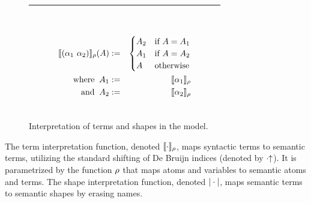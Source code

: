 \documentclass[english, mgr]{iithesis}
\begin{document}
\begin{figure}[htbp]
\begin{tabularx}{\textwidth}{|C|}
\begin{subfigure}{0.47\textwidth}
\begin{eqnarray*}
        & & \\
      \end{eqnarray*}
    \end{subfigure}
    \begin{subfigure}{0.43\textwidth}
      \begin{eqnarray*}
        \llbracket (\alpha_1\ \alpha_2) \rrbracket_{\rho}(A)  & := &
          \begin{cases}
            A_2 & \text{if } A = A_1 \\
            A_1 & \text{if } A = A_2 \\
            A   & \text{otherwise}
          \end{cases} \\
        \text{where }\: A_1 & := &  \llbracket \alpha_1 \rrbracket_{\rho} \\
        \text{  and }\: A_2 & := &  \llbracket \alpha_2 \rrbracket_{\rho} \\
      \end{eqnarray*}
    \end{subfigure}
    \\ \hline
  \end{tabularx}
  \caption{Interpretation of terms and shapes in the model.}
  \label{fig:terms-shapes-interpretation}
\end{figure}
The term interpretation function, denoted $\llbracket \cdot \rrbracket_{\rho}$,
maps syntactic terms to semantic terms,
utilizing the standard shifting of De Bruijn indices (denoted by $\cdot\kern-3pt \uparrow$).
It is parametrized by the function $\rho$ that maps atoms and variables to
semantic atoms and terms.
The shape interpretation function, denoted $|\cdot|$,
maps semantic terms to semantic shapes by erasing names.
\end{document}
